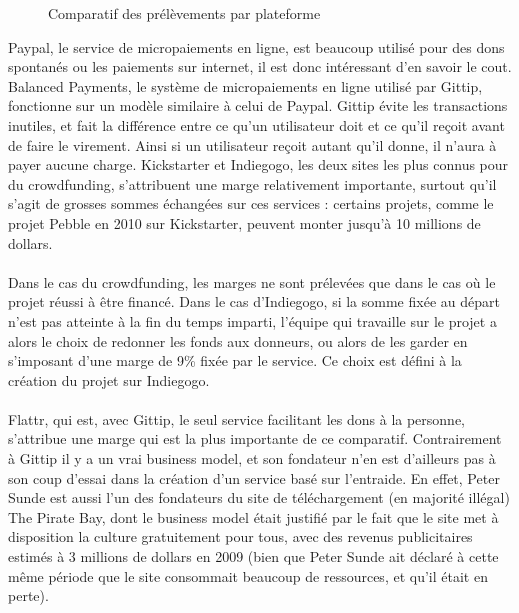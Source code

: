 \begin{figure}[h!]
    \caption{Comparatif des prélèvements par plateforme}
\end{figure}

Paypal, le service de micropaiements en ligne,  est beaucoup utilisé pour des
dons spontanés ou les paiements sur internet, il est donc intéressant d'en
savoir le cout. Balanced Payments, le système de micropaiements en ligne utilisé
par Gittip, fonctionne sur un modèle similaire à celui de Paypal. Gittip évite
les transactions inutiles, et fait la différence entre ce qu'un utilisateur
doit et ce qu'il reçoit avant de faire le virement. Ainsi si un utilisateur
reçoit autant qu'il donne, il n'aura à payer aucune charge. Kickstarter et
Indiegogo, les deux sites les plus connus pour du crowdfunding, s'attribuent
une marge relativement importante, surtout qu'il s'agit de grosses sommes
échangées sur ces services : certains projets, comme le projet Pebble en 2010
sur Kickstarter, peuvent monter jusqu'à 10 millions de dollars.

\paragraph{}
Dans le cas du crowdfunding, les marges ne sont prélevées que dans le cas où le
projet réussi à être financé. Dans le cas d'Indiegogo, si la somme fixée au
départ n'est pas atteinte à la fin du temps imparti, l'équipe qui travaille sur
le projet a alors le choix de redonner les fonds aux donneurs, ou alors de les
garder en s'imposant d'une marge de 9\%{} fixée par le service. Ce choix est
défini à la création du projet sur Indiegogo.

\paragraph{}
Flattr, qui est, avec Gittip, le seul service facilitant les dons à la
personne, s'attribue une marge qui est la plus importante de ce comparatif.
Contrairement à Gittip il y a un vrai business model, et son fondateur n'en est
d'ailleurs pas à son coup d'essai dans la création d'un service basé sur
l'entraide. En effet, Peter Sunde est aussi l'un des fondateurs du site de
téléchargement (en majorité illégal) The Pirate Bay, dont le business model
était justifié par le fait que le site met à disposition la culture
gratuitement pour tous, avec des revenus publicitaires estimés à 3 millions de
dollars en 2009 (bien que Peter Sunde ait déclaré à cette même période que le
site consommait beaucoup de ressources, et qu'il était en perte).

